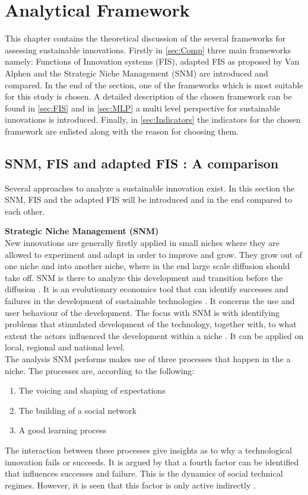 \section{Analytical Framework}
This chapter contains the theoretical discussion of the several frameworks for assessing sustainable innovations. Firstly in \autoref{sec:Comp} three main frameworks namely: Functions of Innovation systems (FIS), adapted FIS as proposed by Van Alphen and the Strategic Niche Management (SNM) are introduced and compared. In the end of the section, one of the frameworks which is most suitable for this study is chosen. A detailed description of the chosen framework can be found in \autoref{sec:FIS} and in \autoref{sec:MLP} a multi level perspective for sustainable innovations is introduced. Finally, in \autoref{sec:Indicators} the indicators for the chosen framework are enlisted along with the reason for choosing them.

\subsection{ SNM, FIS and adapted FIS : A comparison}
\label{sec:Comp}
Several approaches to analyze a sustainable innovation exist. In this section the SNM, FIS and the adapted FIS will be introduced and in the end compared to each other.

\textbf{Strategic Niche Management (SNM)}\\
New innovations are generally firstly applied in small niches where they are allowed to experiment and adapt in order to improve and grow. They grow out of one niche and into another niche, where in the end large scale diffusion should take off. SNM is there to analyze this development and transition before the diffusion \citep{Laak2007}. It is an evolutionary economics tool that can identify successes and failures in the development of sustainable technologies \citep{Eijck2008}. It concerns the use and user behaviour of the development. The focus with SNM is with identifying problems that stimulated development of the technology, together with, to what extent the actors influenced the development within a niche \citep{Raven2005}. It can be applied on local, regional and national level.\\
\noindent The analysis SNM performs makes use of three processes that happen in the a niche. The processes are, according to \cite{Laak2007} the following: 
\begin{enumerate}
    \item The voicing and shaping of expectations
    \item The building of a social network
    \item A good learning process
\end{enumerate}
The interaction between these processes give insights as to why a technological innovation fails or succeeds. 
It is argued by \cite{Raven2005} that a fourth factor can be identified that influences successes and failure. This is the dynamics of social technical regimes. However, it is seen that this factor is only active indirectly \citep{Laak2007}.

